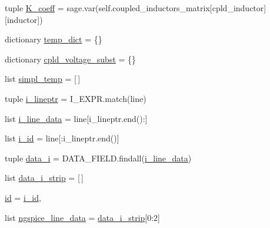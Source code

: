 \begin{DoxyCompactItemize}
\item 
tuple \hyperlink{classsage__circuit__analysis_1_1SmallSignalLinearCircuit_a9d21174a0350225ee439c9b509035c34}{K\-\_\-coeff} = sage.\-var(self.\-coupled\-\_\-inductors\-\_\-matrix\mbox{[}cpld\-\_\-inductor\mbox{]}\mbox{[}inductor\mbox{]})
\item 
dictionary \hyperlink{classsage__circuit__analysis_1_1SmallSignalLinearCircuit_a658b1156885db3147258661884092df7}{temp\-\_\-dict} = \{\}
\item 
dictionary \hyperlink{classsage__circuit__analysis_1_1SmallSignalLinearCircuit_a294c9d4ae2e8cc4ff716b80cc605f251}{cpld\-\_\-voltage\-\_\-subst} = \{\}
\item 
list \hyperlink{classsage__circuit__analysis_1_1SmallSignalLinearCircuit_a9b0bc8ae5c71e493b0d6d7c342eb076a}{simpl\-\_\-temp} = \mbox{[}$\,$\mbox{]}
\item 
tuple \hyperlink{classsage__circuit__analysis_1_1SmallSignalLinearCircuit_a484b5a464c4658b66aaff522264ece21}{i\-\_\-lineptr} = I\-\_\-\-E\-X\-P\-R.\-match(line)
\item 
list \hyperlink{classsage__circuit__analysis_1_1SmallSignalLinearCircuit_a819b64951a0eca799e6acf35843144dc}{i\-\_\-line\-\_\-data} = line\mbox{[}i\-\_\-lineptr.\-end()\-:\mbox{]}
\item 
list \hyperlink{classsage__circuit__analysis_1_1SmallSignalLinearCircuit_acede0d2722f0ac9c236c6a0d4ba406c8}{i\-\_\-id} = line\mbox{[}\-:i\-\_\-lineptr.\-end()\mbox{]}
\item 
tuple \hyperlink{classsage__circuit__analysis_1_1SmallSignalLinearCircuit_a662be7a3e5ce9c105591c4084687cee5}{data\-\_\-i} = D\-A\-T\-A\-\_\-\-F\-I\-E\-L\-D.\-findall(\hyperlink{classsage__circuit__analysis_1_1SmallSignalLinearCircuit_a819b64951a0eca799e6acf35843144dc}{i\-\_\-line\-\_\-data})
\item 
list \hyperlink{classsage__circuit__analysis_1_1SmallSignalLinearCircuit_af10504fc9a6ed527011be0b0f833f2de}{data\-\_\-i\-\_\-strip} = \mbox{[}$\,$\mbox{]}
\item 
\hyperlink{classsage__circuit__analysis_1_1SmallSignalLinearCircuit_af96e861cd3bbea68a6a29fee525a593c}{id} = \hyperlink{classsage__circuit__analysis_1_1SmallSignalLinearCircuit_acede0d2722f0ac9c236c6a0d4ba406c8}{i\-\_\-id},
\item 
list \hyperlink{classsage__circuit__analysis_1_1SmallSignalLinearCircuit_a3a5187d07369572c10a3c227b1267f16}{ngspice\-\_\-line\-\_\-data} = \hyperlink{classsage__circuit__analysis_1_1SmallSignalLinearCircuit_af10504fc9a6ed527011be0b0f833f2de}{data\-\_\-i\-\_\-strip}\mbox{[}0\-:2\mbox{]}

\end{DoxyCompactItemize}
